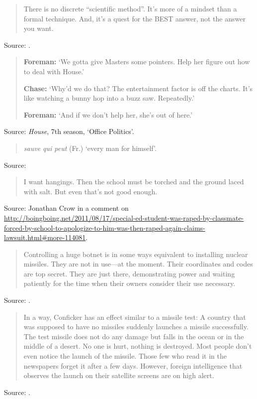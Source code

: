 \documentclass[a4paper]{article}
\begin{document}
\begin{quote}
	There is no discrete ``scientific method''. It's more of a mindset than a formal technique.
And, it's a quest for the BEST answer, not the answer you want.
\end{quote}
Source: \citet{idoubtit2011}.
\medskip

\begin{quote}
	\textbf{Foreman:} `We gotta give Masters some pointers.  Help her figure out how to deal with
	House.'

    \textbf{Chase:} `Why'd we do that?  The entertainment factor is off the charts.  It's like
	watching a bunny hop into a buzz saw.  Repeatedly.'

    \textbf{Foreman:} `And if we don't help her, she's out of here.'
\end{quote}
Source: \emph{House}, 7th season, `Office Politics'.
\medskip

\begin{quote}
	\emph{sauve qui peut} (Fr.) `every man for himself'.
\end{quote}
Source: 
\medskip

\begin{quote}
I want hangings. Then the school must be torched and the ground laced with salt. But even that's
not good enough.
\end{quote}
Source: Jonathan Crow in a comment on
\url{http://boingboing.net/2011/08/17/special-ed-student-was-raped-by-classmate-forced-by-school-to-apologize-to-him-was-then-raped-again-claims-lawsuit.html#more-114081}.
\medskip

\begin{quote}
	Controlling a huge botnet is in some ways equivalent to installing nuclear missiles.  They are
not in use---at the moment.  Their coordinates and codes are top secret.  They are just there,
demonstrating power and waiting patiently for the time when their owners consider their use
necessary.
\end{quote}
Source: \citet[p.\ 185]{Rost2011}.
\medskip

\begin{quote}
	In a way, Conficker has an effect similar to a missile test: A country that was supposed to
have no missiles suddenly launches a missile successfully.  The test missile does not do any damage
but falls in the ocean or in the middle of a desert.  No one is hurt, nothing is destroyed.  Most
people don't even notice the launch of the missile.  Those few who read it in the newspapers forget
it after a few days.  However, foreign intelligence that observes the launch on their satellite
screens are on high alert.
\end{quote}
Source: \citet[p.\ 185]{Rost2011}.
\medskip
\end{document}

